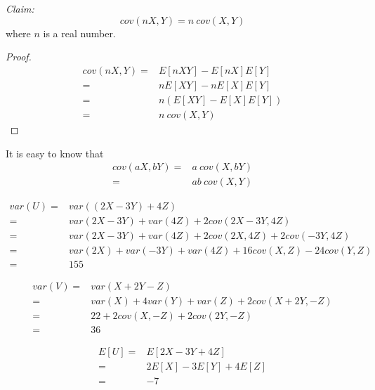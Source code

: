 \documentclass{article}
\begin{document}
        \textit{Claim:}
            $$cov(nX,Y)=n\ cov(X,Y)$$
           where $n$ is a real number.
        \begin{proof}
            \begin{equation*}
                \begin{split}
                    cov(nX,Y)=&E[nXY]-E[nX]E[Y]\\
                        =&nE[XY]-nE[X]E[Y]\\
                        =&n(E[XY]-E[X]E[Y])\\
                        =&n\ cov(X,Y)
                \end{split}
            \end{equation*}
        \end{proof}
        It is easy to know that
        \begin{equation*}
            \begin{split}
                cov(aX,bY)=&a\ cov(X,bY)\\
                    =&ab\ cov(X,Y)
            \end{split}
        \end{equation*}

        \begin{equation*}
            \begin{split}
                var(U)=&var((2X-3Y)+4Z)\\
                    =&var(2X-3Y)+var(4Z)+2cov(2X-3Y,4Z)\\
                    =&var(2X-3Y)+var(4Z)+2cov(2X,4Z)+2cov(-3Y,4Z)\\
                    =&var(2X)+var(-3Y)+var(4Z)+16cov(X,Z)-24cov(Y,Z)\\
                    =&155
            \end{split}
        \end{equation*}

        \begin{equation*}
            \begin{split}
                var(V)=&var(X+2Y-Z)\\
                    =&var(X)+4var(Y)+var(Z)+2cov(X+2Y,-Z)\\
                    =&22+2cov(X,-Z)+2cov(2Y,-Z)\\
                    =&36
            \end{split}
        \end{equation*}

        \begin{equation*}
            \begin{split}
                E[U]=&E[2X-3Y+4Z]\\
                    =&2E[X]-3E[Y]+4E[Z]\\
                    =&-7
            \end{split}
        \end{equation*}
\end{document}
